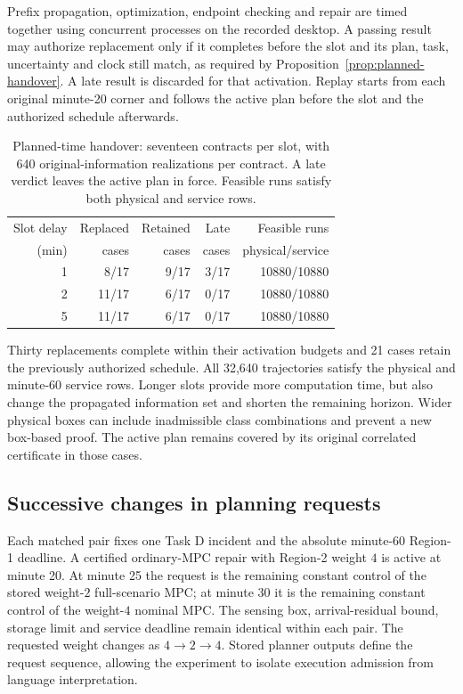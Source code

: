 \documentclass[journal,10pt]{IEEEtran}
\begin{document}
Prefix propagation, optimization, endpoint checking and repair are timed
together using concurrent processes on the recorded desktop. A passing
result may authorize replacement only if it completes before the slot and
its plan, task, uncertainty and clock still match, as required by
Proposition~\ref{prop:planned-handover}. A late result is discarded for that
activation. Replay starts from each original minute-20 corner and follows
the active plan before the slot and the authorized schedule afterwards.

\begin{table}[t]
\centering\small
\caption{Planned-time handover: seventeen contracts per slot, with 640
original-information realizations per contract. A late verdict leaves the
active plan in force. Feasible runs satisfy both physical and service rows.}
\label{supp:detail:tab:delayed-handover}
\begin{tabular}{@{}rrrrr@{}}
\toprule
Slot delay & Replaced & Retained & Late & Feasible runs\\
(min) & cases & cases & cases & physical/service\\
\midrule
1 & 8/17 & 9/17 & 3/17 & 10880/10880\\
2 & 11/17 & 6/17 & 0/17 & 10880/10880\\
5 & 11/17 & 6/17 & 0/17 & 10880/10880\\
\bottomrule
\end{tabular}
\end{table}

Thirty replacements complete within their activation budgets and 21 cases
retain the previously authorized schedule. All 32,640 trajectories satisfy
the physical and minute-60 service rows. Longer slots provide more
computation time, but also change the propagated information set and
shorten the remaining horizon. Wider physical boxes can include
inadmissible class combinations and prevent a new box-based proof. The
active plan remains covered by its original correlated certificate in
those cases.

\subsection{Successive changes in planning requests}
\label{app:sequential-handover}
Each matched pair fixes one Task D incident and the absolute minute-60
Region-1 deadline. A certified ordinary-MPC repair with Region-2 weight
$4$ is active at minute 20. At minute 25 the request is the remaining
constant control of the stored weight-$2$ full-scenario MPC; at minute 30
it is the remaining constant control of the weight-$4$ nominal MPC. The
sensing box, arrival-residual bound, storage limit and service deadline
remain identical within each pair. The requested weight changes as
$4\to2\to4$. Stored planner outputs define the request sequence, allowing
the experiment to isolate execution admission from language interpretation.
\end{document}
